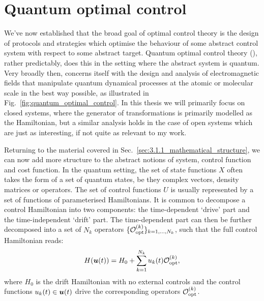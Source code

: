 \section{Quantum optimal control}\label{sec:3.2_Quantum_optimal_control}

We've now established that the broad goal of optimal control theory is the design of protocols and strategies which optimise the behaviour of some abstract control system with respect to some abstract target. Quantum optimal control theory (), rather predictably, does this in the setting where the abstract system is quantum. Very broadly then,  concerns itself with the design and analysis of electromagnetic fields that manipulate quantum dynamical processes at the atomic or molecular scale in the best way possible, as illustrated in Fig.~\ref{fig:quantum_optimal_control}. In this thesis we will primarily focus on closed systems, where the generator of transformations is primarily modelled as the Hamiltonian, but a similar analysis holds in the case of open systems which are just as interesting, if not quite as relevant to my work.

Returning to the material covered in Sec.~\ref{sec:3.1.1_mathematical_structure}, we can now add more structure to the abstract notions of system, control function and cost function. In the quantum setting, the set of state functions $X$ often takes the form of a set of quantum states, be they complex vectors, density matrices or operators. The set of control functions $U$ is usually represented by a set of functions of parameterised Hamiltonians. It is common to decompose a control Hamiltonian into two components: the time-dependent `drive' part and the time-independent `drift' part. The time-dependent part can then be further decomposed into a set of $N_k$ operators $\{\mathcal{O}_{\rm opt}^{(k)}\}_{k=1,...,N_k}$, such that the full control Hamiltonian reads:
\begin{equation}\label{eq:optimal_control_H}
    H(\boldsymbol{u}(t)) = H_0 + \sum_{k = 1}^{N_k} u_k(t) \mathcal{O}_{\rm opt}^{(k)},
\end{equation}
where $H_0$ is the drift Hamiltonian with no external controls and the control functions $u_k(t) \in \boldsymbol{u}(t)$ drive the corresponding operators $\mathcal{O}_{\rm opt}^{(k)}$.

